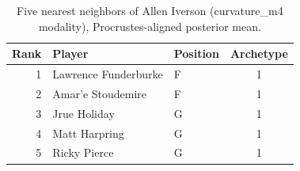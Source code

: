 \begin{table}[htbp]
  \centering\small
  \begin{tabular}{rllc}
    \toprule
    Rank & Player & Position & Archetype \\
    \midrule
    1 & Lawrence Funderburke & F & 1 \\
    2 & Amar'e Stoudemire & F & 1 \\
    3 & Jrue Holiday & G & 1 \\
    4 & Matt Harpring & G & 1 \\
    5 & Ricky Pierce & G & 1 \\
    \bottomrule
  \end{tabular}
  \caption{Five nearest neighbors of Allen Iverson (curvature_m4 modality), Procrustes-aligned posterior mean.}
  \label{tab:Allen_Iverson_neighbors_curvature_m4}
\end{table}

